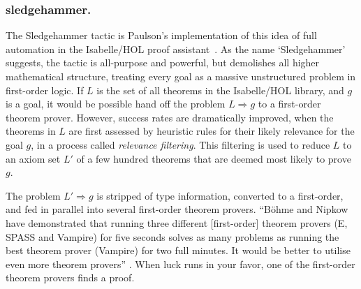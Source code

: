 \documentclass{llncs}
\begin{document}

\subsubsection{sledgehammer.}

The Sledgehammer tactic is Paulson's implementation of this idea of full automation in
the Isabelle/HOL proof assistant~\cite{Paar}.  As the name `Sledgehammer' suggests,
the tactic is all-purpose and powerful, but demolishes all higher
mathematical structure, treating every goal as a massive unstructured
problem in first-order logic.  If $L$ is the set of all theorems in
the Isabelle/HOL library, and $g$ is a goal, it would be possible hand
off the problem $L\Longrightarrow g$ to a first-order theorem
prover.  However, success rates are dramatically improved, when the
theorems in $L$ are first assessed by heuristic rules for their likely
relevance for the goal $g$, in a process called {\it relevance
  filtering}. 
This filtering is used to reduce $L$ to an axiom set $L'$ of a
few hundred theorems that are deemed most likely to prove $g$.

The problem $L'\Longrightarrow g$ is stripped of type information,
converted to a first-order, and fed in parallel into several
first-order theorem provers.
 ``B\"ohme and Nipkow \cite{Boehme-Nipkow-IJCAR10} have demonstrated that
running three different [first-order] theorem provers (E, SPASS and
Vampire) for five seconds solves as many problems as running the
best theorem prover (Vampire) for two full minutes.  It would be
better to utilise even more theorem provers'' 
\cite{Paar}.
When luck runs in your favor, one of the first-order theorem provers
finds a proof.
\end{document}
